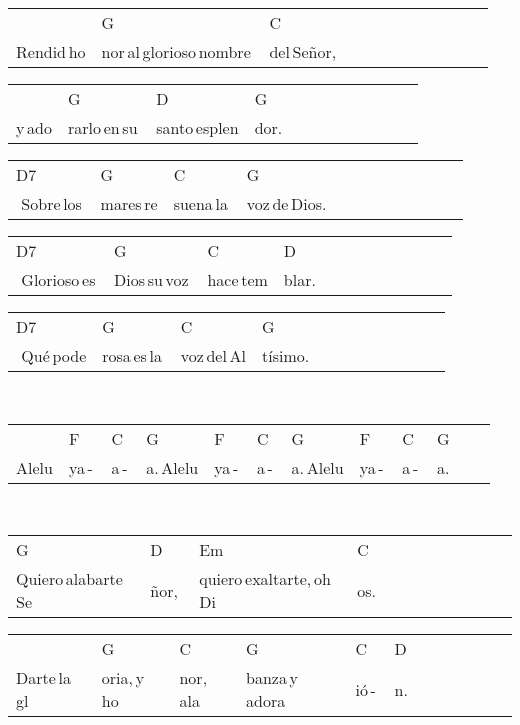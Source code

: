 \begin{multicols}{2}
\begin{minipage}{\columnwidth}
\noindent
\begin{tabular}{llllllllllll}
&G&C\\
Rendid\,ho&nor\,al\,glorioso\,nombre\,&del\,Señor,
\end{tabular}

\noindent
\begin{tabular}{llllllllllll}
&G&D&G\\
y\,ado&rarlo\,en\,su\,&santo\,esplen&dor.
\end{tabular}

\noindent
\begin{tabular}{llllllllllll}
D7&G&C&G\\
\,\quad\,Sobre\,los\,&mares\,re&suena\,la\,&voz\,de\,Dios.
\end{tabular}

\noindent
\begin{tabular}{llllllllllll}
D7&G&C&D\\
\,\quad\,Glorioso\,es\,&Dios\,su\,voz\,&hace\,tem&blar.
\end{tabular}

\noindent
\begin{tabular}{llllllllllll}
D7&G&C&G\\
\,\quad\,Qué\,pode&rosa\,es\,la\,&voz\,del\,Al&tísimo.
\end{tabular}
\end{minipage}\\

\noindent
\begin{minipage}{\columnwidth}
\noindent
\noindent
\begin{tabular}{llllllllllll}
&F&C&G&F&C&G&F&C&G\\
Alelu&ya\,-\,&a\,-\,&a.\,Alelu&ya\,-\,&a\,-\,&a.\,Alelu&ya\,-\,&a\,-\,&a.
\end{tabular}
\end{minipage}\\

\noindent
\begin{minipage}{\columnwidth}
\noindent
\noindent
\begin{tabular}{llllllllllll}
G&D&Em&C\\
Quiero\,alabarte\,Se&ñor,\,\quad\,&quiero\,exaltarte,\,oh\,Di&os.
\end{tabular}

\noindent
\begin{tabular}{llllllllllll}
&G&C&G&C&D\\
Darte\,la\,gl&oria,\,y\,ho&nor,\,ala&banza\,y\,adora&ió\,-\,&n.
\end{tabular}


\end{minipage}
\end{multicols}
